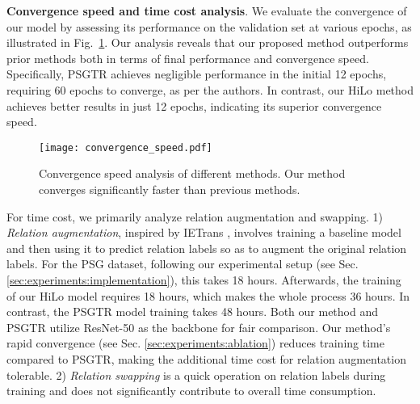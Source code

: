 \noindent \textbf{Convergence speed and time cost analysis}.
We evaluate the convergence of our model by assessing its performance on the validation set at various epochs, as illustrated in Fig.~\ref{figure:convergence_speed}.
Our analysis reveals that our proposed method outperforms prior methods \cite{yang2022panoptic} both in terms of final performance and convergence speed.
Specifically, PSGTR \cite{yang2022panoptic} achieves negligible performance in the initial 12 epochs, requiring 60 epochs to converge, as per the authors.
In contrast, our HiLo method achieves better results in just 12 epochs, indicating its superior convergence speed.

\begin{figure}
\begin{center}
\texttt{[image: convergence\_speed.pdf]}
\end{center}
\vspace{-2mm}
\caption{Convergence speed analysis of different methods. 
Our method converges significantly faster than previous methods.}
\vspace{-6mm}
\label{figure:convergence_speed}
\end{figure}

For time cost, we primarily analyze relation augmentation and swapping.
1) \textit{Relation augmentation}, inspired by IETrans \cite{zhang2022fine}, involves training a baseline model and then using it to predict relation labels so as to augment the original relation labels. 
For the PSG dataset, following our experimental setup (see Sec. \ref{sec:experiments:implementation}), this takes 18 hours.
Afterwards, the training of our HiLo model requires 18 hours, which makes the whole process 36 hours.
In contrast, the PSGTR model training takes 48 hours.
Both our method and PSGTR utilize ResNet-50 as the backbone for fair comparison.
Our method's rapid convergence (see Sec. \ref{sec:experiments:ablation}) reduces training time compared to PSGTR, making the additional time cost for relation augmentation tolerable.
2) \textit{Relation swapping} is a quick operation on relation labels during training and does not significantly contribute to overall time consumption.


